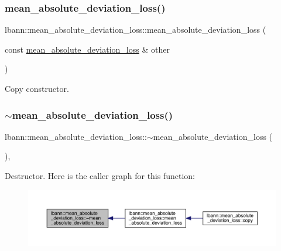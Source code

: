 \subsubsection{\texorpdfstring{mean\+\_\+absolute\+\_\+deviation\+\_\+loss()}{mean\_absolute\_deviation\_loss()}\hspace{0.1cm}{\footnotesize\ttfamily [2/2]}}
{\footnotesize\ttfamily lbann\+::mean\+\_\+absolute\+\_\+deviation\+\_\+loss\+::mean\+\_\+absolute\+\_\+deviation\+\_\+loss (\begin{DoxyParamCaption}\item[{const \hyperlink{classlbann_1_1mean__absolute__deviation__loss}{mean\+\_\+absolute\+\_\+deviation\+\_\+loss} \&}]{other }\end{DoxyParamCaption})\hspace{0.3cm}{\ttfamily [default]}}

Copy constructor. \mbox{\label{classlbann_1_1mean__absolute__deviation__loss_a913786e64e160f849a3b08a7c46ce75a}} 
\subsubsection{\texorpdfstring{$\sim$mean\+\_\+absolute\+\_\+deviation\+\_\+loss()}{~mean\_absolute\_deviation\_loss()}}
{\footnotesize\ttfamily lbann\+::mean\+\_\+absolute\+\_\+deviation\+\_\+loss\+::$\sim$mean\+\_\+absolute\+\_\+deviation\+\_\+loss (\begin{DoxyParamCaption}{ }\end{DoxyParamCaption})\hspace{0.3cm}{\ttfamily [override]}, {\ttfamily [default]}}

Destructor. Here is the caller graph for this function\+:\nopagebreak
\begin{figure}[H]
\begin{center}
\leavevmode
\includegraphics[width=350pt]{classlbann_1_1mean__absolute__deviation__loss_a913786e64e160f849a3b08a7c46ce75a_icgraph}
\end{center}
\end{figure}


